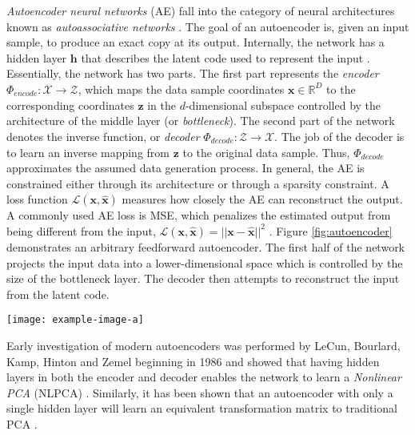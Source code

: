 \textit{Autoencoder neural networks} (AE) fall into the category of neural architectures known as \textit{autoassociative networks} \citep{Rojas1996AssociativeNetworks}.  The goal of an autoencoder is, given an input sample, to produce an exact copy at its output.  Internally, the network has a hidden layer $\bm{h}$ that describes the latent code used to represent the input \citep{Goodfellow2016DeepLearning}.  Essentially, the network has two parts.  The first part represents the \textit{encoder} $\Phi_{encode}:\mathcal{X} \rightarrow \mathcal{Z}$, which maps the data sample coordinates $\bm{x} \in \mathbb{R}^{D}$ to the corresponding coordinates $\bm{z}$ in the $d$-dimensional subspace controlled by the architecture of the middle layer (or \textit{bottleneck}).  The second part of the network denotes the inverse function, or \textit{decoder} $\Phi_{decode}:\mathcal{Z} \rightarrow \hat{\mathcal{X}}$.   The job of the decoder is to learn an inverse mapping from $\bm{z}$ to the original data sample.  Thus, $\Phi_{decode}$ approximates the assumed data generation process.  In general,  the AE is constrained either through its architecture or through a sparsity constraint.  A loss function $\mathcal{L}(\bm{x},\hat{\bm{x}})$  measures how closely the AE can reconstruct the output.  A commonly used AE loss is MSE, which penalizes the estimated output from being different from the input, $\mathcal{L}(\bm{x},\hat{\bm{x}}) = ||\bm{x} -  \hat{\bm{x}}||^{2}$ \citep{Ball2017DLRemoteSensing}.  Figure \ref{fig:autoencoder} demonstrates an arbitrary feedforward autoencoder.  The first half of the network projects the input data into a lower-dimensional space which is controlled by the size of the bottleneck layer.  The decoder then attempts to reconstruct the input from the latent code.
\begin{center}
	\begin{figure*}[h]
		\centering
		\texttt{[image: example-image-a]}
		\caption[Autoencoder neural network]{}
		\label{fig:autoencoder}
	\end{figure*}
\end{center}

Early investigation of modern autoencoders was performed by LeCun, Bourlard, Kamp, Hinton and Zemel beginning in 1986 \citep{Goodfellow2016DeepLearning, Bengio2014RepLearningReview} and showed that having hidden layers in both the encoder and decoder enables the network to learn a \textit{Nonlinear PCA} (NLPCA) \citep{Scholz2008NonlinearPCA}. Similarly, it has been shown that an autoencoder with only a single hidden layer will learn an equivalent transformation matrix to traditional PCA \citep{Bengio2014RepLearningReview}.


